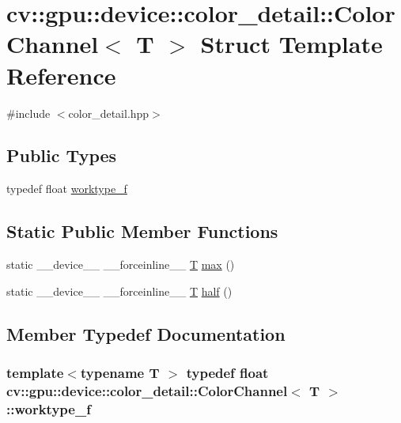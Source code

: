 \hypertarget{structcv_1_1gpu_1_1device_1_1color__detail_1_1ColorChannel}{\section{cv\-:\-:gpu\-:\-:device\-:\-:color\-\_\-detail\-:\-:Color\-Channel$<$ T $>$ Struct Template Reference}
\label{structcv_1_1gpu_1_1device_1_1color__detail_1_1ColorChannel}
}


{\ttfamily \#include $<$color\-\_\-detail.\-hpp$>$}

\subsection*{Public Types}
\begin{DoxyCompactItemize}
\item 
typedef float \hyperlink{structcv_1_1gpu_1_1device_1_1color__detail_1_1ColorChannel_a8cbd448b4932dfdd0192013c78112e19}{worktype\-\_\-f}
\end{DoxyCompactItemize}
\subsection*{Static Public Member Functions}
\begin{DoxyCompactItemize}
\item 
static \-\_\-\-\_\-device\-\_\-\-\_\- \-\_\-\-\_\-forceinline\-\_\-\-\_\- \hyperlink{calib3d_8hpp_a3efb9551a871ddd0463079a808916717}{T} \hyperlink{structcv_1_1gpu_1_1device_1_1color__detail_1_1ColorChannel_aedd738fa8d5f922cb3dffcb3fe005b7d}{max} ()
\item 
static \-\_\-\-\_\-device\-\_\-\-\_\- \-\_\-\-\_\-forceinline\-\_\-\-\_\- \hyperlink{calib3d_8hpp_a3efb9551a871ddd0463079a808916717}{T} \hyperlink{structcv_1_1gpu_1_1device_1_1color__detail_1_1ColorChannel_ad020f174d41d85e13cac35a75582b7ee}{half} ()
\end{DoxyCompactItemize}


\subsection{Member Typedef Documentation}
\hypertarget{structcv_1_1gpu_1_1device_1_1color__detail_1_1ColorChannel_a8cbd448b4932dfdd0192013c78112e19}{
\subsubsection[{worktype\-\_\-f}]{\setlength{\rightskip}{0pt plus 5cm}template$<$typename T $>$ typedef float {\bf cv\-::gpu\-::device\-::color\-\_\-detail\-::\-Color\-Channel}$<$ {\bf T} $>$\-::{\bf worktype\-\_\-f}}}\label{structcv_1_1gpu_1_1device_1_1color__detail_1_1ColorChannel_a8cbd448b4932dfdd0192013c78112e19}


